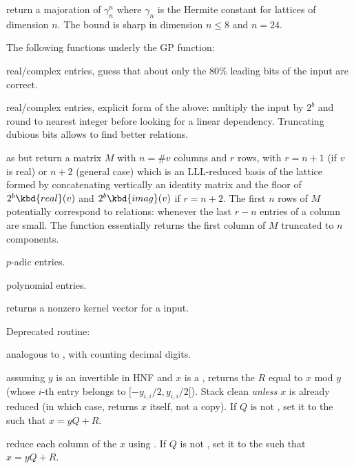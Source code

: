 return a majoration of $\gamma_n^n$ where $\gamma_n$ is the
Hermite constant for lattices of dimension $n$. The bound is sharp in
dimension $n \leq 8$ and $n = 24$.


The following functions underly the  GP function:

 real/complex entries, guess that about only the
80\% leading bits of the input are correct.

 real/complex entries, explicit form of the
above: multiply the input by $2^b$ and round to nearest integer before
looking for a linear dependency. Truncating dubious bits allows to find
better relations.

 as  but return a
matrix $M$ with $n = \#v$ columns and $r$ rows, with $r = n+1$ (if $v$ is
real) or $n+2$ (general case) which is an LLL-reduced basis of the lattice
formed by concatenating vertically an identity matrix and the floor of $2^b
\kbd{real}(v)$ and $2^b \kbd{imag}(v)$ if $r = n+2$. The first $n$ rows of
$M$ potentially correspond to relations: whenever the last $r-n$ entries of a
column are small. The function  essentially returns the
first column of $M$ truncated to $n$ components.

 $p$-adic entries.

 polynomial entries.

 returns a nonzero kernel vector for a  input.

Deprecated routine:

 analogous to , with
 counting decimal digits.


 assuming $y$ is an
invertible  in HNF and $x$ is a , returns the  $R$
equal to $x$ mod $y$ (whose $i$-th entry belongs to $[-y_{i,i}/2, y_{i,i}/2[$).
Stack clean \emph{unless} $x$ is already reduced (in which case, returns $x$
itself, not a copy). If $Q$ is not , set it to the  such that
$x = yQ + R$.

 reduce
each column of the  $x$ using . If $Q$ is not
, set it to the  such that $x = yQ + R$.

